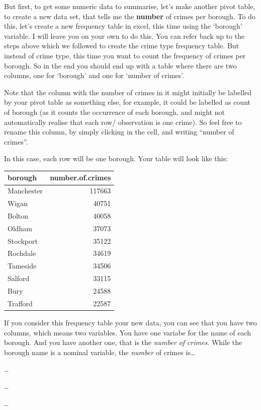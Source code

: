 \documentclass[]{book}
\theoremstyle{definition}
\theoremstyle{definition}
\theoremstyle{definition}
\theoremstyle{remark}
\begin{document}
But first, to get some numeric data to summarise, let's make another
pivot table, to create a new data set, that tells me the \textbf{number}
of crimes per borough. To do this, let's create a new frequency table in
excel, this time using the `borough' variable. I will leave you on your
own to do this. You can refer back up to the steps above which we
followed to create the crime type frequency table. But instead of crime
type, this time you want to count the frequency of crimes per borough.
So in the end you should end up with a table where there are two
columns, one for `borough' and one for `number of crimes'.

Note that the column with the number of crimes in it might initially be
labelled by your pivot table as something else, for example, it could be
labelled as count of borough (as it counts the occurrence of each
borough, and might not automatically realise that each row/ observation
is one crime). So feel free to rename this column, by simply clicking in
the cell, and writing ``number of crimes''.

In this case, each row will be one borough. Your table will look like
this:

\begin{tabular}{l|r}
\hline
borough & number.of.crimes\\
\hline
Manchester & 117663\\
\hline
Wigan & 40751\\
\hline
Bolton & 40058\\
\hline
Oldham & 37073\\
\hline
Stockport & 35122\\
\hline
Rochdale & 34619\\
\hline
Tameside & 34506\\
\hline
Salford & 33115\\
\hline
Bury & 24588\\
\hline
Trafford & 22587\\
\hline
\end{tabular}

If you consider this frequency table your new data, you can see that you
have two columns, which means two variables. You have one variabe for
the name of each borough. And you have another one, that is the
\emph{number of crimes}. While the borough name is a nominal variable,
the \emph{number} of crimes is\ldots{}

\ldots{}

\ldots{}

\ldots{}
\end{document}
